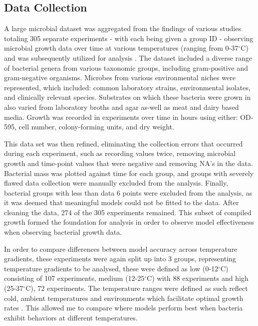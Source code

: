 \documentclass[11pt]{article}
\begin{document}
    \subsection{Data Collection}
    A large microbial dataset was aggregated from the findings of various studies totaling 305 separate experiments - with each being given a group ID - observing microbial growth data over time at various temperatures (ranging from 0-37$^\circ$C) and was subsequently utilized for analysis \cite{roth1962continuity, sivonen1990effects, bae2014growth, gill1991growth, bernhardt2018metabolic, zwietering1994modeling, galarz2016predicting, karnat2024study, stannard1985temperature, phillips1987relation}. The dataset included a diverse range of bacterial genera from various taxonomic groups, including gram-positive and gram-negative organisms. Microbes from various environmental niches were represented, which included: common laboratory strains, environmental isolates, and clinically relevant species. Substrates on which these bacteria were grown in also varied from laboratory broths and agar as-well as meat and dairy based media. Growth was recorded in experiments over time in hours using either: OD-595, cell number, colony-forming units, and dry weight.
    \setlength{\parskip}{1.2em} %
    
    This data set was then refined, eliminating the collection errors that occurred during each experiment, such as recording values twice, removing microbial growth and time-point values that were negative and removing NA's in the data. Bacterial mass was plotted against time for each group, and groups with severely flawed data collection were manually excluded from the analysis. Finally, bacterial groups with less than data 6 points were excluded from the analysis, as it was deemed that meaningful models could not be fitted to the data.   
    After cleaning the data, 274 of the 305 experiments remained. This subset of compiled growth formed the foundation for analysis in order to observe model effectiveness when observing bacterial growth data. 
    \setlength{\parskip}{1.2em} %

    In order to compare differences between model accuracy across temperature gradients, these experiments were again split up into 3 groups, representing temperature gradients to be analysed, these were defined as low (0-12$^\circ$C) consisting of 107 experiments, medium (12-25$^\circ$C) with 88 experiments and high (25-37$^\circ$C), 72 experiments. The temperature ranges were defined as such reflect cold, ambient temperatures and environments which facilitate optimal growth rates \cite{ratkowsky1982relationship}. This allowed me to compare where models perform best when bacteria exhibit behaviors at different temperatures.
\end{document}
